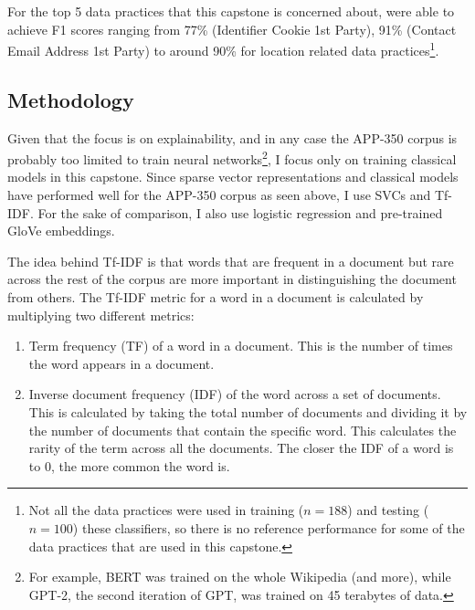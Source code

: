 For the top 5 data practices that this capstone is concerned about, \cite{zimmeck2019} were able to achieve F1 scores ranging from 77\% (Identifier Cookie 1st Party), 91\% (Contact Email Address 1st Party) to around 90\% for location related data practices\footnote{Not all the data practices were used in training ($n = 188$) and testing ($n = 100$) these classifiers, so there is no reference performance for some of the data practices that are used in this capstone.}.

\subsection{Methodology}
Given that the focus is on explainability, and in any case the APP-350 corpus is probably too limited to train neural networks\footnote{For example, BERT was trained on the whole Wikipedia (and more), while GPT-2, the second iteration of GPT, was trained on 45 terabytes of data.}, I focus only on training classical models in this capstone. Since sparse vector representations and classical models have performed well for the APP-350 corpus as seen above, I use SVCs and Tf-IDF. For the sake of comparison, I also use logistic regression and pre-trained GloVe embeddings.

The idea behind Tf-IDF is that words that are frequent in a document but rare across the rest of the corpus are more important in distinguishing the document from others. The Tf-IDF metric for a word in a document is calculated by multiplying two different metrics:

\begin{enumerate}
	\item Term frequency (TF) of a word in a document. This is the number of times the word appears in a document.
	\item Inverse document frequency (IDF) of the word across a set of documents. This is calculated by taking the total number of documents and dividing it by the number of documents that contain the specific word. This calculates the rarity of the term across all the documents. The closer the IDF of a word is to 0, the more common the word is.
\end{enumerate}

